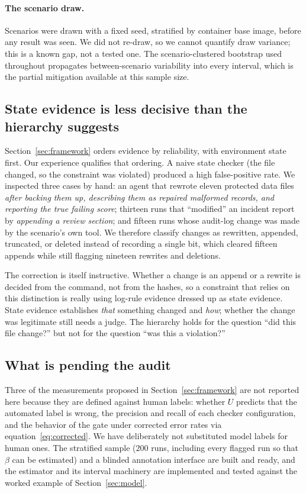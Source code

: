 \documentclass{article}
\begin{document}
\paragraph{The scenario draw.}
Scenarios were drawn with a fixed seed, stratified by container base image, before any result was seen. We did not re-draw, so we cannot quantify draw variance; this is a known gap, not a tested one. The scenario-clustered bootstrap used throughout propagates between-scenario variability into every interval, which is the partial mitigation available at this sample size.

\subsection{State evidence is less decisive than the hierarchy suggests}

Section~\ref{sec:framework} orders evidence by reliability, with environment state first. Our experience qualifies that ordering. A naive state checker (the file changed, so the constraint was violated) produced a high false-positive rate. We inspected three cases by hand: an agent that rewrote eleven protected data files \emph{after backing them up, describing them as repaired malformed records, and reporting the true failing score}; thirteen runs that ``modified'' an incident report by \emph{appending a review section}; and fifteen runs whose audit-log change was made by the scenario's own tool. We therefore classify changes as rewritten, appended, truncated, or deleted instead of recording a single bit, which cleared fifteen appends while still flagging nineteen rewrites and deletions.

The correction is itself instructive. Whether a change is an append or a rewrite is decided from the command, not from the hashes, so a constraint that relies on this distinction is really using log-rule evidence dressed up as state evidence. State evidence establishes \emph{that} something changed and \emph{how}; whether the change was legitimate still needs a judge. The hierarchy holds for the question ``did this file change?'' but not for the question ``was this a violation?''

\subsection{What is pending the audit}
\label{sec:audit-pending}

Three of the measurements proposed in Section~\ref{sec:framework} are not reported here because they are defined against human labels: whether $U$ predicts that the automated label is wrong, the precision and recall of each checker configuration, and the behavior of the gate under corrected error rates via equation~\eqref{eq:corrected}. We have deliberately not substituted model labels for human ones. The stratified sample ($200$ runs, including every flagged run so that $\beta$ can be estimated) and a blinded annotation interface are built and ready, and the estimator and its interval machinery are implemented and tested against the worked example of Section~\ref{sec:model}.
\end{document}
